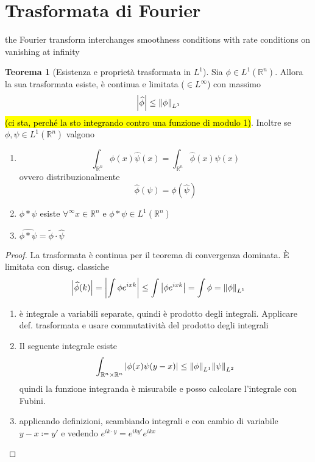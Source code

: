 \documentclass[a4paper,10pt]{article}
\theoremstyle{definition}
\newcommand{\re}{\mathbb{R}} %
\theoremstyle{indentdefinition}
\theoremstyle{indenttheorem}
\newtheorem{thm}{Teorema}
\theoremstyle{myremark}
\theoremstyle{indentgeneral}
\newenvironment{myboxed} 
{\noindent\begin{lrbox}{\mybox}\begin{minipage}{\textwidth}}
{\end{minipage}\end{lrbox}\fbox{\usebox{\mybox}}}
\begin{document}
\section{Trasformata di Fourier}
the Fourier transform interchanges smoothness conditions with rate conditions on vanishing at infinity\\
\begin{myboxed}
    \begin{thm}[Esistenza e proprietà trasformata in $L^1$] Sia $\phi\in L^1(\re^n)$. Allora la sua trasformata esiste, è continua e limitata ($\in L^\infty$) con massimo 
    $$\abs{\widehat{\phi}}\le \norm{\phi}_{L^1}$$
        \hl{(ci sta, perché la sto integrando contro una funzione di modulo 1)}. Inoltre  se  $\phi,\psi\in L^1(\re^n)$ valgono
        \begin{enumerate}
            \item 
            $$\int_{\re^n}\phi(x)\widehat{\psi}(x)=\int_{\re^n}\widehat{\phi}(x)\psi(x)$$
            ovvero distribuzionalmente
            $$\widehat{\phi}(\psi)=\phi(\widehat{\psi})$$
            \item $\phi*\psi$ esiste $\forall^\infty x\in\re^n$ e $\phi*\psi\in L^1(\re^n)$
            \item $\widehat{\phi*\psi}=\widetilde{\phi}\cdot\widehat{\psi}$
        \end{enumerate}
    \end{thm}
\end{myboxed}
\begin{proof}
    La trasformata è continua per il teorema di convergenza dominata. È limitata con disug. classiche
    $$\abs{\widehat{\phi}(k)}=\abs{\int\phi e^{ixk}}\le \int\abs{\phi e^{ixk}}=\int\phi=\norm{\phi}_{L^1}$$
    \begin{enumerate}
        \item è integrale a variabili separate, quindi è prodotto degli integrali. Applicare def. trasformata e usare commutatività del prodotto degli integrali
        \item Il seguente integrale esiste
        $$\int_{\re^n\times\re^n}\abs{\phi(x)\psi(y-x)}\le \norm{\phi}_{L^1}\norm{\psi}_{L^2}$$
        quindi la funzione integranda è misurabile e posso calcolare l'integrale con Fubini.
        \item applicando definizioni, scambiando integrali e con cambio di variabile $y-x\coloneqq y'$ e vedendo $e^{ik\cdot y}=e^{iky'}e^{ikx}$
    \end{enumerate}
\end{proof}
\end{document}
